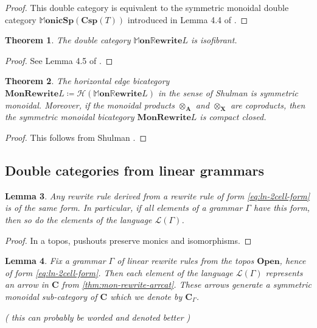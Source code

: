 \documentclass{amsart}
\newcommand{\A}{\cat{A}}
\newcommand{\C}{\cat{C}}
\newcommand{\LinArrCat}{\cat{C}}
\newcommand{\X}{\cat{X}}
\newcommand{\cat}[1]{\mathbf{#1}}
\newcommand{\MMonSpCsp}[1]{\mathbb{M}\mathbf{onicSp}(\mathbf{Csp}(#1))}
\newcommand{\OpenOb}{\mathbf{Open} }
\newcommand{\MonRewrite}{ \mathbf{MonRewrite}}
\newcommand{\MMonRewrite}{ \mathbb{M}\mathbf{on}\mathbb{R}\mathbf{ewrite} }
\newcommand{\edit}[1]{\textcolor{editcolour}{(#1)}}
\newtheorem{theorem}{Theorem}[section]
\newtheorem{lemma}[theorem]{Lemma}
\theoremstyle{remark}
\theoremstyle{definition}
\begin{document}
\begin{proof}
  This double category is equivalent to the symmetric monoidal double
  category $\MMonSpCsp{T}$ introduced in Lemma 4.4 of
  \cite{sp-csp-top}.
\end{proof}

\begin{theorem} \label{thm:dbl-mon-rewrite_isofibrant}
  The double category $ \MMonRewrite{L} $ is isofibrant.
\end{theorem}

\begin{proof}
  See Lemma 4.5 of \cite{sp-csp-top}.
\end{proof}

\begin{theorem} \label{thm:bi-mon-rewrite-scmm}
  The horizontal edge bicategory
  $ \MonRewrite{L} \coloneqq \mathcal{H} \left( \MMonRewrite{L}
  \right) $ in the sense of Shulman is symmetric monoidal.  Moreover,
  if the monoidal products $ \otimes_{\A} $ and $ \otimes_{\X} $ are
  coproducts, then the symmetric monoidal bicategory
  $ \MonRewrite{L} $ is compact closed.
\end{theorem}

\begin{proof}
  This follows from Shulman \cite{shulman-constructing}.
\end{proof}


\subsection{Double categories from linear grammars}
\label{sec:dblcats-linr-gramrs}

\begin{lemma} \label{thm:der-rewr-rule-dbl-monic}
  Any rewrite rule derived from a rewrite rule of form
  \eqref{eq:ln-2cell-form} is of the same form. In particular, if all
  elements of a grammar \( \Gamma \) have this form, then so do the
  elements of the language \( \mathcal{L} (\Gamma) \).
\end{lemma}

\begin{proof}
  In a topos, pushouts preserve monics and isomorphisms.
\end{proof}

\begin{lemma} \label{thm:lr_open-objects-language}
  Fix a grammar $ \Gamma $ of linear rewrite rules from the topos $
  \OpenOb $, hence of form \eqref{eq:ln-2cell-form}. Then each element
  of the language $ \mathcal{L}(\Gamma) $ represents an arrow in \( \C
  \) from \ref{thm:mon-rewrite-arrcat}. These arrows generate a
  symmetric monoidal sub-category of \( \LinArrCat \) which we denote
  by \( \LinArrCat_\Gamma \).

  \edit{ this can probably be worded and denoted better }
\end{lemma}
\end{document}
